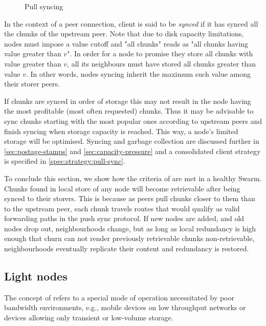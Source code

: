 \begin{figure}[htbp]
   \centering
   \caption[Pull syncing]{Pull syncing}
   \label{fig:pull-syncing}
\end{figure}

In the context of a peer connection, client is said to be \emph{synced} if it has synced all the chunks of the upstream peer. Note that due to disk capacity limitations, nodes must impose a value cutoff and "all chunks" reads as "all chunks having value greater than $v$". In  order for a node to promise they store all chunks with value greater than $v$, all its neighbours must have stored all chunks greater than value $v$. In other words, nodes syncing inherit the maximum such value among their storer peers. 

If chunks are synced in order of storage this may not result in the node having the most profitable (most often requested) chunks. Thus it may be advisable to sync chunks starting with the most popular ones according to upstream peers and finish syncing when storage capacity is reached. This way, a node's limited storage will be optimised. Syncing and garbage collection are discussed further in \ref{sec:postage-stamps} and \ref{sec:capacity-pressure} and a consolidated client strategy is specified in \ref{spec:strategy:pull-sync}.

To conclude this section, we show how the criteria of  are met in a healthy Swarm. Chunks found in local store of any node will become retrievable after being synced to their storers. This is because as peers pull chunks closer to  them than to the upstream peer, each chunk travels routes that would qualify as valid forwarding paths in the push sync protocol. If new nodes are added, and old nodes drop out, neighbourhoods change, but as long as local redundancy is high enough that churn can not render previously retrievable chunks non-retrievable, neighbourhoods eventually replicate their content and redundancy is restored. 


\subsection{Light nodes}
\label{sec:light}

The concept of  refers to a special mode of operation necessitated by poor bandwidth environments, e.g., mobile devices on low throughput networks or devices allowing only transient or low-volume storage.

